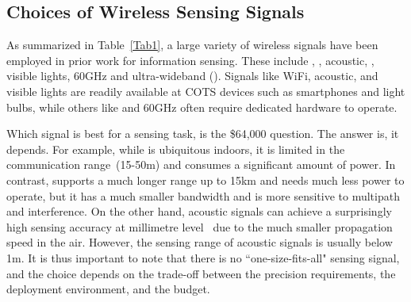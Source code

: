 \subsection {Choices of Wireless Sensing Signals}


As summarized in Table~\ref{Tab1}, a large variety of wireless signals have been employed in prior work for information sensing. These include
\WiFi, \RFID, acoustic, \LoRa, visible lights, 60GHz and ultra-wideband (\UWB). Signals like
WiFi, acoustic, and visible lights are readily available at COTS devices such as smartphones and light bulbs,
while others like \UWB and 60GHz often require dedicated hardware to operate.



Which signal is best for a sensing task, is the \$64,000 question. The answer is, it depends. For example, while \WiFi is ubiquitous indoors, it is limited in the communication range~(15-50m) and consumes a significant amount of power. In contrast, \LoRa
supports a much longer range up to 15km and needs much less power to operate, but it has a much smaller bandwidth and is more
sensitive to multipath and interference. %
On the other hand, acoustic signals can achieve a surprisingly high sensing accuracy at millimetre level~\cite{LLAP} due to the much smaller propagation speed in the air. However, the sensing range of acoustic signals is usually below 1m.
It is thus important to note
that there is no ``one-size-fits-all" sensing signal, and the choice depends on the trade-off between the precision requirements, the
deployment environment, and the budget.
